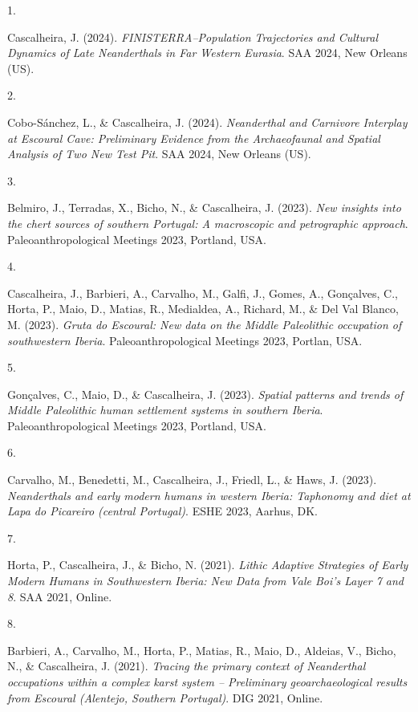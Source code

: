 \documentclass[11pt,a4paper,]{awesome-cv}
\newlength{\cslhangindent}
\newlength{\csllabelwidth}
\newenvironment{CSLReferences}[2] %
 {\begin{list}{}{%
  \setlength{\itemindent}{0pt}
  \setlength{\leftmargin}{0pt}
  \setlength{\parsep}{0pt}
  \ifodd #1
   \setlength{\leftmargin}{\cslhangindent}
   \setlength{\itemindent}{-1\cslhangindent}
  \fi
  \setlength{\itemsep}{#2\baselineskip}}}
 {\end{list}}
\newcommand{\CSLLeftMargin}[1]{\parbox[t]{\csllabelwidth}{\strut#1\strut}}
\newcommand{\CSLRightInline}[1]{\parbox[t]{\linewidth - \csllabelwidth}{\strut#1\strut}}
\begin{document}
\label{refs-76cb30b9c6f851aec58215c378661ba7}
\begin{CSLReferences}{0}{0}
\CSLLeftMargin{1. }%
\CSLRightInline{Cascalheira, J. (2024). \emph{FINISTERRA--Population
Trajectories and Cultural Dynamics of Late Neanderthals in Far Western
Eurasia}. SAA 2024, New Orleans (US).}

\CSLLeftMargin{2. }%
\CSLRightInline{Cobo-Sánchez, L., \& Cascalheira, J. (2024).
\emph{Neanderthal and Carnivore Interplay at Escoural Cave: Preliminary
Evidence from the Archaeofaunal and Spatial Analysis of Two New Test
Pit}. SAA 2024, New Orleans (US).}

\CSLLeftMargin{3. }%
\CSLRightInline{Belmiro, J., Terradas, X., Bicho, N., \& Cascalheira, J.
(2023). \emph{New insights into the chert sources of southern Portugal:
A macroscopic and petrographic approach}. Paleoanthropological Meetings
2023, Portland, USA.}

\CSLLeftMargin{4. }%
\CSLRightInline{Cascalheira, J., Barbieri, A., Carvalho, M., Galfi, J.,
Gomes, A., Gonçalves, C., Horta, P., Maio, D., Matias, R., Medialdea,
A., Richard, M., \& Del Val Blanco, M. (2023). \emph{Gruta do Escoural:
New data on the Middle Paleolithic occupation of southwestern Iberia}.
Paleoanthropological Meetings 2023, Portlan, USA.}

\CSLLeftMargin{5. }%
\CSLRightInline{Gonçalves, C., Maio, D., \& Cascalheira, J. (2023).
\emph{Spatial patterns and trends of Middle Paleolithic human settlement
systems in southern Iberia}. Paleoanthropological Meetings 2023,
Portland, USA.}

\CSLLeftMargin{6. }%
\CSLRightInline{Carvalho, M., Benedetti, M., Cascalheira, J., Friedl,
L., \& Haws, J. (2023). \emph{Neanderthals and early modern humans in
western Iberia: Taphonomy and diet at Lapa do Picareiro (central
Portugal)}. ESHE 2023, Aarhus, DK.}

\CSLLeftMargin{7. }%
\CSLRightInline{Horta, P., Cascalheira, J., \& Bicho, N. (2021).
\emph{Lithic Adaptive Strategies of Early Modern Humans in Southwestern
Iberia: New Data from Vale Boi's Layer 7 and 8}. SAA 2021, Online.}

\CSLLeftMargin{8. }%
\CSLRightInline{Barbieri, A., Carvalho, M., Horta, P., Matias, R., Maio,
D., Aldeias, V., Bicho, N., \& Cascalheira, J. (2021). \emph{Tracing the
primary context of Neanderthal occupations within a complex karst system
-- Preliminary geoarchaeological results from Escoural (Alentejo,
Southern Portugal)}. DIG 2021, Online.}


\end{CSLReferences}
\end{document}
